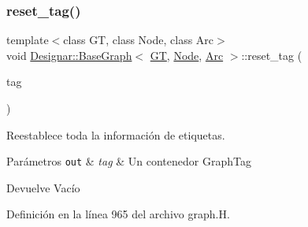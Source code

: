 \subsubsection{\texorpdfstring{reset\+\_\+tag()}{reset\_tag()}}
{\footnotesize\ttfamily template$<$class GT, class Node, class Arc$>$ \\
void \hyperlink{class_designar_1_1_base_graph}{Designar\+::\+Base\+Graph}$<$ \hyperlink{demo-buildgraph_8_c_a3001c40d2c31ca87ed96cd7d1334a55e}{GT}, \hyperlink{namespace_designar_a5af326c65aa2bd26b26c410f2030d09e}{Node}, \hyperlink{namespace_designar_a3f55fb5513d62ff47cbc8f72b8e95d6f}{Arc} $>$\+::reset\+\_\+tag (\begin{DoxyParamCaption}\item[{\hyperlink{namespace_designar_ac91366256ea6ea6ac5fd483d55a7499e}{Graph\+Tag}}]{tag }\end{DoxyParamCaption})\hspace{0.3cm}{\ttfamily [inline]}}



Reestablece toda la información de etiquetas. 


\begin{DoxyParams}[1]{Parámetros}
\mbox{\tt out}  & {\em tag} & Un contenedor Graph\+Tag \\
\hline
\end{DoxyParams}
\begin{DoxyReturn}{Devuelve}
Vacío 
\end{DoxyReturn}


Definición en la línea 965 del archivo graph.\+H.

\mbox{\label{class_designar_1_1_base_graph_a0fc6cebdbc639235992617c49f8d395e}} 
